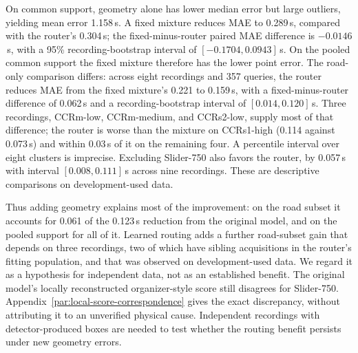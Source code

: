On common support, geometry alone has lower median error but large outliers, yielding mean error 1.158\,s. A fixed mixture reduces MAE to 0.289\,s, compared with the router's 0.304\,s; the fixed-minus-router paired MAE difference is $-0.0146$\,s, with a 95\% recording-bootstrap interval of $[-0.1704,0.0943]$\,s. On the pooled common support the fixed mixture therefore has the lower point error. The road-only comparison differs: across eight recordings and 357 queries, the router reduces MAE from the fixed mixture's 0.221 to 0.159\,s, with a fixed-minus-router difference of 0.062\,s and a recording-bootstrap interval of $[0.014,0.120]$\,s. Three recordings, CCRm-low, CCRm-medium, and CCRs2-low, supply most of that difference; the router is worse than the mixture on CCRs1-high (0.114 against 0.073\,s) and within 0.03\,s of it on the remaining four. A percentile interval over eight clusters is imprecise. Excluding Slider-750 also favors the router, by 0.057\,s with interval $[0.008,0.111]$\,s across nine recordings. These are descriptive comparisons on development-used data.

Thus adding geometry explains most of the improvement: on the road subset it accounts for 0.061 of the 0.123\,s reduction from the original model, and on the pooled support for all of it. Learned routing adds a further road-subset gain that depends on three recordings, two of which have sibling acquisitions in the router's fitting population, and that was observed on development-used data. We regard it as a hypothesis for independent data, not as an established benefit. The original model's locally reconstructed organizer-style score still disagrees for Slider-750. Appendix~\ref{par:local-score-correspondence} gives the exact discrepancy, without attributing it to an unverified physical cause. Independent recordings with detector-produced boxes are needed to test whether the routing benefit persists under new geometry errors.
\FloatBarrier
